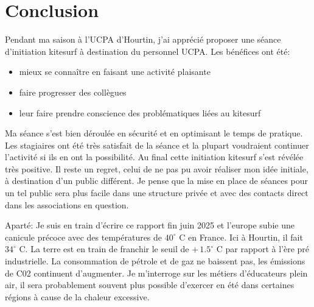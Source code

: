 \documentclass[11pt,a4paper]{report}
\begin{document}
\section{Conclusion}

Pendant ma saison à l'UCPA d'Hourtin, j'ai apprécié proposer une 
séance d'initiation kitesurf à destination du personnel UCPA.
Les bénéfices ont été:
\begin{itemize}
\item mieux se connaître en faisant une activité plaisante
\item faire progresser des collègues
\item leur faire prendre conscience  des problématiques liées au kitesurf
\end{itemize}

Ma séance s'est bien déroulée en sécurité et en optimisant 
le temps de pratique. Les stagiaires ont été très satisfait de la 
séance et la plupart voudraient continuer l'activité si ils en 
ont la possibilité. 
Au final cette initiation kitesurf s'est révélée très positive.
Il reste un regret, celui de ne pas pu avoir réaliser mon idée initiale, 
à destination d'un public différent. Je pense que la mise en place de séances
pour un tel public sera plus facile dans une structure privée et avec des
contacts direct dans les associations en question.


Aparté: Je suis en train d'écrire ce rapport fin juin 2025 et l'europe subie
une canicule précoce avec des températures de $40^{\circ}$ C en France. Ici à Hourtin, 
il fait $34^{\circ}$ C.
La terre est en train de franchir le seuil  de  $+\, 1.5^{\circ}$ C par rapport
 à l'ère pré industrielle. La consommation de pétrole et de gaz ne baissent pas, les 
émissions de C02 continuent d'augmenter.
Je m'interroge sur les métiers d'éducateurs plein air, il sera
probablement souvent plus possible d'exercer en été dans certaines 
régions à cause de la chaleur excessive. 


\end{document}
